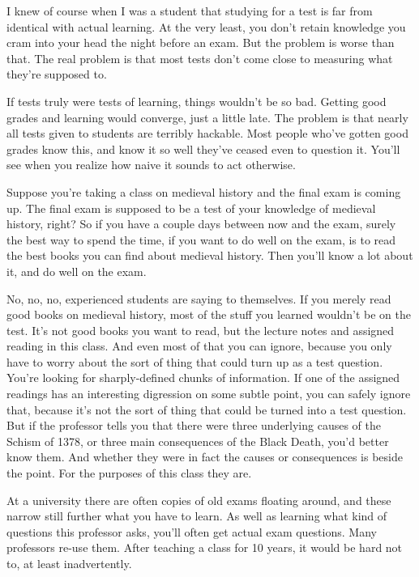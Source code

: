 I knew of course when I was a student that studying for a test is far
from identical with actual learning. At the very least, you don't retain
knowledge you cram into your head the night before an exam. But the
problem is worse than that. The real problem is that most tests don't
come close to measuring what they're supposed to.

If tests truly were tests of learning, things wouldn't be so bad.
Getting good grades and learning would converge, just a little late. The
problem is that nearly all tests given to students are terribly
hackable. Most people who've gotten good grades know this, and know it
so well they've ceased even to question it. You'll see when you realize
how naive it sounds to act otherwise.

Suppose you're taking a class on medieval history and the final exam is
coming up. The final exam is supposed to be a test of your knowledge of
medieval history, right? So if you have a couple days between now and
the exam, surely the best way to spend the time, if you want to do well
on the exam, is to read the best books you can find about medieval
history. Then you'll know a lot about it, and do well on the exam.

No, no, no, experienced students are saying to themselves. If you merely
read good books on medieval history, most of the stuff you learned
wouldn't be on the test. It's not good books you want to read, but the
lecture notes and assigned reading in this class. And even most of that
you can ignore, because you only have to worry about the sort of thing
that could turn up as a test question. You're looking for
sharply-defined chunks of information. If one of the assigned readings
has an interesting digression on some subtle point, you can safely
ignore that, because it's not the sort of thing that could be turned
into a test question. But if the professor tells you that there were
three underlying causes of the Schism of 1378, or three main
consequences of the Black Death, you'd better know them. And whether
they were in fact the causes or consequences is beside the point. For
the purposes of this class they are.

At a university there are often copies of old exams floating around, and
these narrow still further what you have to learn. As well as learning
what kind of questions this professor asks, you'll often get actual exam
questions. Many professors re-use them. After teaching a class for 10
years, it would be hard not to, at least inadvertently.

